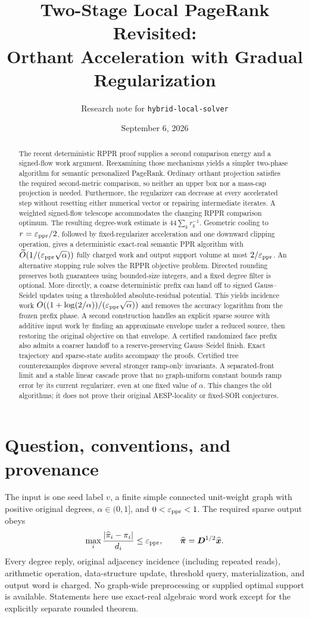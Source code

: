 \documentclass[11pt]{article}
\title{Two-Stage Local PageRank Revisited:\\
Orthant Acceleration with Gradual Regularization}
\author{Research note for \texttt{hybrid-local-solver}}
\date{September 6, 2026}
\begin{document}
\maketitle
\begin{abstract}
The recent deterministic RPPR proof supplies a second comparison energy
and a signed-flow work argument. Reexamining those mechanisms yields a
simpler two-phase algorithm for semantic personalized PageRank. Ordinary
orthant projection satisfies the required second-metric comparison, so
neither an upper box nor a mass-cap projection is needed. Furthermore,
the regularizer can decrease at every accelerated step without resetting
either numerical vector or repairing intermediate iterates. A weighted
signed-flow telescope accommodates the changing RPPR comparison optimum.
The resulting degree-work estimate is
$44\sum_k r_k^{-1}$. Geometric cooling to $r=\varepsilon_{\mathrm{ppr}}/2$, followed by
fixed-regularizer acceleration and one downward clipping operation, gives
a deterministic exact-real semantic PPR algorithm with
$\widetilde O(1/(\varepsilon_{\mathrm{ppr}}\sqrt\alpha))$ fully charged work and output
support volume at most $2/\varepsilon_{\mathrm{ppr}}$. An alternative stopping rule solves
the RPPR objective problem. Directed rounding preserves both guarantees
using bounded-size integers, and a fixed degree filter is optional.
More directly, a coarse deterministic prefix can hand off to signed
Gauss--Seidel updates using a thresholded absolute-residual potential.
This yields incidence work
$O((1+\log(2/\alpha))/(\varepsilon_{\mathrm{ppr}}\sqrt\alpha))$ and removes the
accuracy logarithm from the frozen prefix phase.
A second construction handles an explicit sparse source with additive
input work by finding an approximate envelope under a reduced source,
then restoring the original objective on that envelope. A certified
randomized face prefix also admits a coarser handoff to a reserve-preserving
Gauss--Seidel finish. Exact trajectory and sparse-state audits accompany
the proofs. Certified tree counterexamples disprove several stronger
ramp-only invariants. A separated-front limit and a stable linear cascade
prove that no graph-uniform constant bounds ramp error by its current
regularizer, even at one fixed value of $\alpha$.
This changes the old algorithms;
it does not prove their original AESP-locality or fixed-SOR conjectures.
\end{abstract}

\section{Question, conventions, and provenance}

The input is one seed label $v$, a finite simple connected unit-weight
graph with positive original degrees, $\alpha\in(0,1]$, and $0<\varepsilon_{\mathrm{ppr}}<1$.
The required sparse output obeys
\[
 \max_i\frac{|\widehat\pi_i-\pi_i|}{d_i}\leq\varepsilon_{\mathrm{ppr}},
 \qquad \widehat{\bm{\pi}}=\bm{D}^{1/2}\widehat{\bm{x}}.
\]
Every degree reply, original adjacency incidence (including repeated
reads), arithmetic operation, data-structure update, threshold query,
materialization, and output word is charged. No graph-wide preprocessing
or supplied optimal support is available. Statements here use exact-real
algebraic word work except for the explicitly separate rounded theorem.
\end{document}
